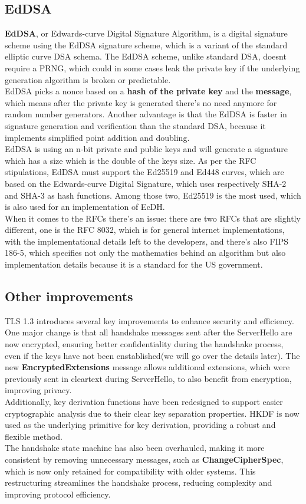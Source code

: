 \subsection{EdDSA}
\textbf{EdDSA}, or Edwards-curve Digital Signature Algorithm, is a digital 
signature scheme using the EdDSA signature scheme, which is a variant
of the standard elliptic curve DSA schema. The EdDSA scheme,
unlike standard DSA, doesnt require a PRNG, which could in some cases
leak the private key if the underlying generation algorithm is broken
or predictable.\\
EdDSA picks a nonce based on a \textbf{hash of the private key} and
the \textbf{message}, which means after the private key is generated
there’s no need anymore for random number generators. Another
advantage is that the EdDSA is faster in signature generation and
verification than the standard DSA, because it implements simplified
point addition and doubling.\\
EdDSA is using an n-bit private and public keys and will generate a
signature which has a size which is the double of the keys size.
As per the RFC stipulations, EdDSA must support the Ed25519 and
Ed448 curves, which are based on the Edwards-curve Digital Signature,
which uses respectively SHA-2 and SHA-3 as hash functions. Among those
two, Ed25519 is the most used, which is also used for an
implementation of EcDH.\\
When it comes to the RFCs there's an issue: there are two RFCs that 
are slightly different, one is the RFC 8032, which is for general
internet implementations, with the implementational details left to
the developers, and there's also FIPS 186-5, which specifies not only
the mathematics behind an algorithm but also implementation details
because it is a standard for the US government.


\subsection{Other improvements}
TLS 1.3 introduces several key improvements to enhance security and
efficiency. One major change is that all handshake messages sent after
the ServerHello are now encrypted, ensuring better confidentiality
during the handshake process, even if the keys have not been
enstablished(we will go over the details later). The new
\textbf{EncryptedExtensions} message allows additional extensions,
which were previously sent in cleartext during ServerHello, to also
benefit from encryption, improving privacy.\\
Additionally, key derivation functions have been redesigned to support
easier cryptographic analysis due to their clear key separation
properties. HKDF is now used as the underlying primitive for key
derivation, providing a robust and flexible method.\\
The handshake state machine has also been overhauled, making it more
consistent by removing unnecessary messages, such as
\textbf{ChangeCipherSpec}, which is now only retained for
compatibility with older systems. This restructuring streamlines the
handshake process, reducing complexity and improving protocol
efficiency.


